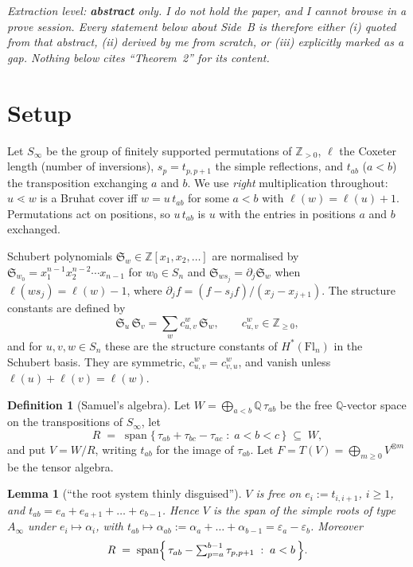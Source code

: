 \documentclass[11pt]{article}
\theoremstyle{plain}
\newtheorem{lemma}[theorem]{Lemma}
\theoremstyle{definition}
\newtheorem{definition}[theorem]{Definition}
\newcommand{\Sch}{\mathfrak{S}}
\newcommand{\Fl}{\mathrm{Fl}}
\newcommand{\sw}{S_\infty}
\DeclareMathOperator{\len}{\ell}
\begin{document}
\emph{Extraction level: \textbf{abstract} only. I do not hold the paper, and I
cannot browse in a prove session. Every statement below about Side~B is
therefore either (i) quoted from that abstract, (ii) derived by me from
scratch, or (iii) explicitly marked as a gap. Nothing below cites
``Theorem~2'' for its content.}

\section{Setup}

Let $\sw$ be the group of finitely supported permutations of
$\mathbb{Z}_{>0}$, $\len$ the Coxeter length (number of inversions),
$s_{p}=t_{p,p+1}$ the simple reflections, and $t_{ab}$ ($a<b$) the
transposition exchanging $a$ and $b$. We use \emph{right} multiplication
throughout: $u\lessdot w$ is a Bruhat cover iff $w=u\,t_{ab}$ for some $a<b$
with $\len(w)=\len(u)+1$. Permutations act on positions, so $u\,t_{ab}$ is $u$
with the entries in positions $a$ and $b$ exchanged.

Schubert polynomials $\Sch_{w}\in\mathbb{Z}[x_{1},x_{2},\dots]$ are normalised
by $\Sch_{w_{0}}=x_{1}^{n-1}x_{2}^{n-2}\cdots x_{n-1}$ for $w_{0}\in S_{n}$ and
$\Sch_{ws_{j}}=\partial_{j}\Sch_{w}$ when $\len(ws_{j})=\len(w)-1$, where
$\partial_{j}f=(f-s_{j}f)/(x_{j}-x_{j+1})$. The structure constants are
defined by
\[
  \Sch_{u}\,\Sch_{v}=\sum_{w}c_{u,v}^{w}\,\Sch_{w},
  \qquad c_{u,v}^{w}\in\mathbb{Z}_{\ge0},
\]
and for $u,v,w\in S_{n}$ these are the structure constants of
$H^{*}(\Fl_{n})$ in the Schubert basis. They are symmetric,
$c_{u,v}^{w}=c_{v,u}^{w}$, and vanish unless $\len(u)+\len(v)=\len(w)$.

\begin{definition}[Samuel's algebra]\label{def:V}
Let $W=\bigoplus_{a<b}\mathbb{Q}\,\tau_{ab}$ be the free $\mathbb{Q}$-vector
space on the transpositions of $\sw$, let
\[
  R \;=\; \operatorname{span}\bigl\{\,\tau_{ab}+\tau_{bc}-\tau_{ac}\;:\;a<b<c\,\bigr\}
  \;\subseteq\;W,
\]
and put $V=W/R$, writing $t_{ab}$ for the image of $\tau_{ab}$. Let
$F=T(V)=\bigoplus_{m\ge0}V^{\otimes m}$ be the tensor algebra.
\end{definition}

\begin{lemma}[``the root system thinly disguised'']\label{lem:roots}
$V$ is free on $e_{i}:=t_{i,i+1}$, $i\ge1$, and $t_{ab}=e_{a}+e_{a+1}+\dots+e_{b-1}$.
Hence $V$ is the span of the simple roots of type $A_{\infty}$ under
$e_{i}\mapsto\alpha_{i}$, with
$t_{ab}\mapsto \alpha_{ab}:=\alpha_{a}+\dots+\alpha_{b-1}=\varepsilon_{a}-\varepsilon_{b}$.
Moreover
\[
  R \;=\; \operatorname{span}\Bigl\{\,\tau_{ab}-\textstyle\sum_{p=a}^{b-1}\tau_{p,p+1}
  \;:\;a<b\,\Bigr\}.
\]
\end{lemma}
\end{document}
